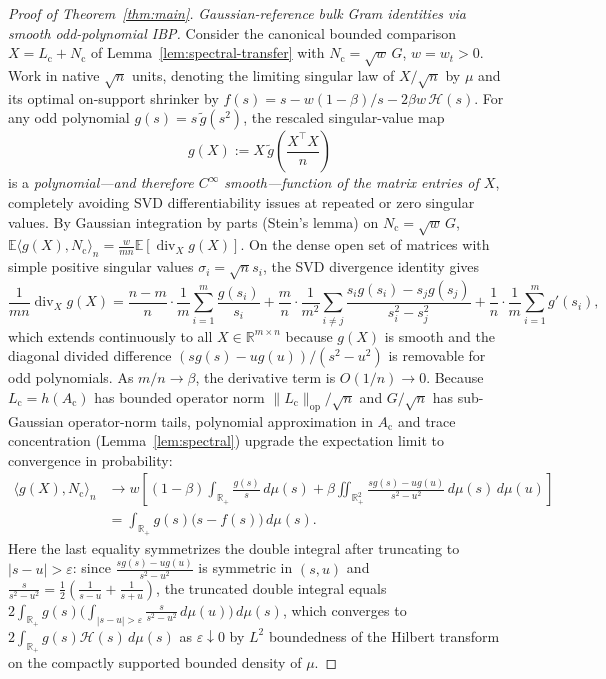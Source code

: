 \documentclass[11pt]{article}
\theoremstyle{plain}
\theoremstyle{definition}
\theoremstyle{remark}
\DeclareMathOperator{\divop}{div}
\newcommand{\E}{\mathbb{E}}
\newcommand{\R}{\mathbb{R}}
\begin{document}
\begin{proof}[Proof of Theorem~\ref{thm:main}]
\emph{Gaussian-reference bulk Gram identities via smooth odd-polynomial IBP.}
Consider the canonical bounded comparison $X = L_{\mathrm{c}} + N_{\mathrm{c}}$ of Lemma~\ref{lem:spectral-transfer} with $N_{\mathrm{c}} = \sqrt{w}\,G$, $w = w_t > 0$. Work in native $\sqrt{n}$ units, denoting the limiting singular law of $X/\sqrt{n}$ by $\mu$ and its optimal on-support shrinker by $f(s) = s - w(1-\beta)/s - 2\beta w\,\mathcal{H}(s)$.
For any odd polynomial $g(s) = s\,\tilde{g}(s^2)$, the rescaled singular-value map
\[
g(X) := X\,\tilde{g}\!\left(\frac{X^\top X}{n}\right)
\]
is a \emph{polynomial—and therefore $C^\infty$ smooth—function of the matrix entries of $X$}, completely avoiding SVD differentiability issues at repeated or zero singular values.
By Gaussian integration by parts (Stein's lemma) on $N_{\mathrm{c}} = \sqrt{w}\,G$, $\E\langle g(X), N_{\mathrm{c}}\rangle_n = \frac{w}{mn}\E[\divop_X g(X)]$.
On the dense open set of matrices with simple positive singular values $\sigma_i = \sqrt{n}s_i$, the SVD divergence identity gives
\[
\frac{1}{mn}\divop_X g(X)
= \frac{n-m}{n}\cdot\frac{1}{m}\sum_{i=1}^m \frac{g(s_i)}{s_i}
  + \frac{m}{n}\cdot\frac{1}{m^2}\sum_{i \neq j}\frac{s_i g(s_i) - s_j g(s_j)}{s_i^2 - s_j^2}
  + \frac{1}{n}\cdot\frac{1}{m}\sum_{i=1}^m g'(s_i),
\]
which extends continuously to all $X \in \R^{m\times n}$ because $g(X)$ is smooth and the diagonal divided difference $(sg(s) - ug(u))/(s^2 - u^2)$ is removable for odd polynomials. As $m/n \to \beta$, the derivative term is $O(1/n) \to 0$. Because $L_{\mathrm{c}} = h(A_{\mathrm{c}})$ has bounded operator norm $\|L_{\mathrm{c}}\|_{\mathrm{op}}/\sqrt{n}$ and $G/\sqrt{n}$ has sub-Gaussian operator-norm tails, polynomial approximation in $A_{\mathrm{c}}$ and trace concentration (Lemma~\ref{lem:spectral}) upgrade the expectation limit to convergence in probability:
\begin{align*}
\langle g(X), N_{\mathrm{c}}\rangle_n
&\longrightarrow w\left[(1-\beta)\int_{\R_+} \frac{g(s)}{s}\,d\mu(s)
  + \beta\iint_{\R_+^2} \frac{s g(s) - u g(u)}{s^2 - u^2}\,d\mu(s)\,d\mu(u)\right] \\
&= \int_{\R_+} g(s)\bigl(s - f(s)\bigr)\,d\mu(s).
\end{align*}
Here the last equality symmetrizes the double integral after truncating to $|s - u| > \varepsilon$: since $\frac{sg(s)-ug(u)}{s^2-u^2}$ is symmetric in $(s,u)$ and $\frac{s}{s^2-u^2} = \frac{1}{2}(\frac{1}{s-u} + \frac{1}{s+u})$, the truncated double integral equals $2\int_{\R_+} g(s)\bigl(\int_{|s-u|>\varepsilon}\frac{s}{s^2-u^2}\,d\mu(u)\bigr)\,d\mu(s)$, which converges to $2\int_{\R_+} g(s)\mathcal{H}(s)\,d\mu(s)$ as $\varepsilon \downarrow 0$ by $L^2$ boundedness of the Hilbert transform on the compactly supported bounded density of $\mu$.

\end{proof}
\end{document}
